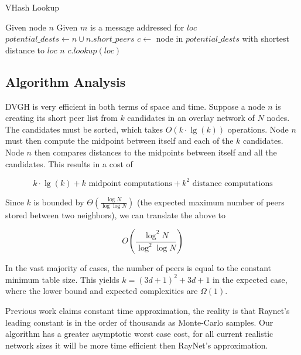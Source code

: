 \documentclass[10pt, conference, letterpaper]{IEEEtran}
\begin{document}
\begin{algorithm}
\caption{VHash Lookup}
\label{lookup}
\begin{algorithmic}[1] 
	\STATE Given node $n$
	\STATE Given $m$ is a message addressed for $loc$
    \STATE $potential\_dests \leftarrow n \cup n.short\_peers$
    \STATE $c \leftarrow $ node in $ potential\_dests$ with shortest distance to $loc$
    	\RETURN $n$
    \ELSE
        \RETURN $c.lookup(loc)$
    \ENDIF
\end{algorithmic}
\end{algorithm}



\subsection{Algorithm Analysis}
DVGH is very efficient in both terms of space and time.  
Suppose a node $n$ is creating its short peer list from $k$ candidates in an overlay network of $N$ nodes. 
The candidates must be sorted, which takes $O(k\cdot\lg(k))$ operations.  
Node $n$ must then compute the midpoint between itself and each of the $k$ candidates.  
Node $n$ then compares distances to the midpoints between itself and all the candidates.  
This results in a cost of 

\[ k\cdot\lg(k) + k \text{ midpoint computations}  + k^{2} \text{ distance computations} \]


Since  $k$ is  bounded by $\Theta(\frac{\log N}{\log \log N} )$ \cite{bern1991expected} (the expected maximum number of peers stored between two neighbors), we can translate the above to

\[O(\frac{\log^{2} N}{\log^{2} \log N} )\]

In the vast majority of cases, the number of peers is equal to the constant minimum table size. This yields $k=(3d+1)^2+3d+1$ in the expected case, where the lower bound and expected complexities are $\Omega(1)$.

Previous work \cite{raynet} claims constant time approximation, the reality is that Raynet's leading constant is in the order of thousands as Monte-Carlo samples.  
Our algorithm has a greater asymptotic worst case cost, for all current realistic network sizes it will be more time efficient then RayNet's approximation.
\end{document}
